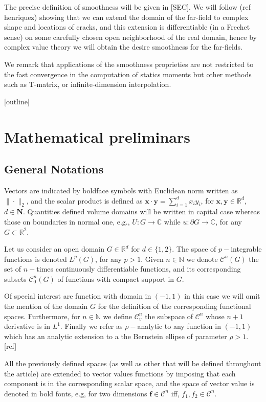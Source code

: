 \documentclass{article}
\newcommand{\todo}[1]{{\color{red}[#1]}}
\begin{document}
The precise definition of smoothness will be given in \todo{SEC}. We will follow (ref henriquez) showing that we can extend the domain of the far-field to complex shape and locations of cracks, and this extension is differentiable (in a Frechet sense) on some carefully chosen open neighborhood of the real domain, hence by complex value theory we will obtain the desire smoothness for the far-fields. 

We remark that applications of the smoothness proprieties are not restricted to the fast convergence in the computation of statics moments but other methods such as T-matrix, or infinite-dimension interpolation. 

\todo{outline}

\section{Mathematical preliminars }
\subsection{General Notations}

Vectors are indicated by boldface symbols with Euclidean norm written as $\| \cdot \|_2$, and the scalar product is defined as $\mathbf{x} \cdot \mathbf{y} = \sum_{i=1}^d x_i y_i$, for $\mathbf{x}, \mathbf{y} \in \mathbb{R}^d$, $d \in \mathbf{N}$. Quantities defined volume domains will be written in capital case whereas those on boundaries
in normal one, e.g., $U : G \rightarrow \mathbb{C}$ while $u:\partial G \rightarrow \mathbb{C}$, for any $G \subset \mathbb{R}^2$.

Let us consider an open domain $G \in \mathbb{R}^d$ for $d \in \{1,2\}$. The space of $p-$integrable functions is denoted $L^p(G)$, for any $p > 1$. Given  $n \in \mathbb{N}$ we denote $\mathcal{C}^n(G)$ the set of $n-$times continuously differentiable functions, and its corresponding subsets $\mathcal{C}^n_0(G)$ of functions with compact support in $G$. 

Of special interest are function with domain in $(-1,1)$ in this case we will omit the mention of the domain $G$ for the definition of the corresponding functional spaces. Furthermore, for $n \in \mathbb{N}$ we define $\mathcal{C}^n_v$ the subspace of $\mathcal{C}^n$ whose $n+1$ derivative is in $L^1$. Finally we refer as $\rho-$analytic to any function in $(-1,1)$ which has an analytic extension to a the Bernstein ellipse of parameter $\rho>1$. \todo{ref}

All the previously defined spaces (as well as other that will be defined throughout the article) are extended to vector values functions  by imposing that each component is in the corresponding scalar space, and the space of vector value is denoted in bold fonts, e.g, for two dimensions $\mathbf{f} \in \mathbf{\mathcal{C}}^n $ iff, $f_1, f_2 \in  \mathcal{C}^n$. 
\end{document}
